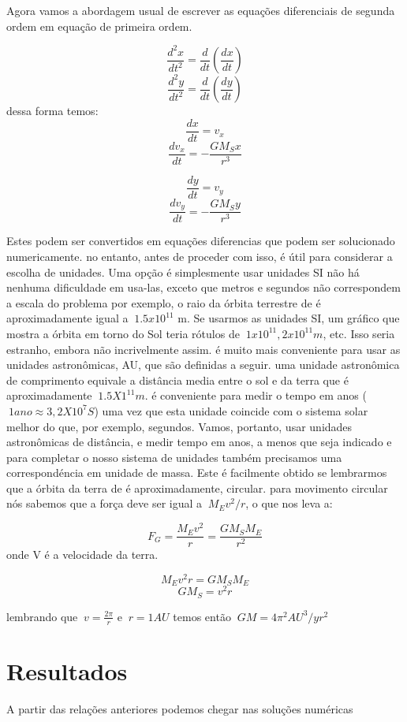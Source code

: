 \documentclass[a4paper]{article} %
\begin{document}
Agora vamos a abordagem usual de escrever as equações diferenciais de segunda ordem em equação de primeira ordem.

\[\frac{d^2x}{dt^2} = \frac{d}{dt}\left(\frac{dx}{dt}\right) \]
\[\frac{d^2y}{dt^2} = \frac{d}{dt}\left(\frac{dy}{dt}\right) \]
dessa forma temos:
\[\frac{dx}{dt} = v_x\] 
\[\frac{dv_x}{dt} = -\frac{GM_Sx}{r^3}\]

\[\frac{dy}{dt} = v_y\] 
\[\frac{dv_y}{dt} = -\frac{GM_Sy}{r^3}\]

Estes podem ser convertidos em equações diferencias que podem ser solucionado numericamente. no entanto, antes de proceder com isso, \'{e} útil para considerar a escolha de unidades. Uma opção é simplesmente usar unidades SI não há nenhuma dificuldade em usa-las, exceto que metros e segundos não correspondem a escala do problema por exemplo, o raio da órbita terrestre de é aproximadamente igual a $\ 1.5 x10^{11}$ m. Se usarmos as unidades SI, um gr\'{a}fico que mostra a \'{o}rbita em torno do Sol teria r\'{o}tulos de $\ 1x10^11, 2x10^11 m$, etc. Isso seria estranho, embora n\~{a}o incrivelmente assim. \'{e} muito mais conveniente para usar as unidades astron\^{o}micas, AU, que s\~{a}o definidas a seguir. uma unidade astron\^{o}mica de comprimento equivale a dist\^{a}ncia media entre o sol e da terra que \'{e} aproximadamente $\ 1.5 X 1^11 m$. \'{e} conveniente para medir o tempo em anos ($\ 1 ano \approx 3,2 X 10^7 S$) uma vez que esta unidade coincide com o sistema solar melhor do que, por exemplo, segundos. Vamos, portanto, usar unidades astron\^{o}micas de dist\^{a}ncia, e medir tempo em anos, a menos que seja indicado e para completar o nosso sistema de unidades tamb\'{e}m precisamos uma correspond\'{e}ncia em unidade de massa. Este \'{e} facilmente obtido se lembrarmos que a \'{o}rbita da terra de é aproximadamente, circular. para movimento circular n\'{o}s sabemos que a força deve ser igual a $\ M_Ev^2/r$, o que nos leva a:

\[F_G = \frac{M_Ev^2}{r} = \frac{GM_SM_E}{r^2}\]
onde V \'{e} a velocidade da terra.

\[M_Ev^2r = GM_SM_E\]
\[GM_S = v^2r \]

lembrando que $\ v = \frac{2\pi}{r}$ e $\ r = 1AU$ temos ent\~{a}o $\ GM = 4\pi^2 AU^3/yr^2$

\section{Resultados}

A partir das relações anteriores podemos chegar nas solu\c{c}\~{o}es num\'{e}ricas 
\end{document}
